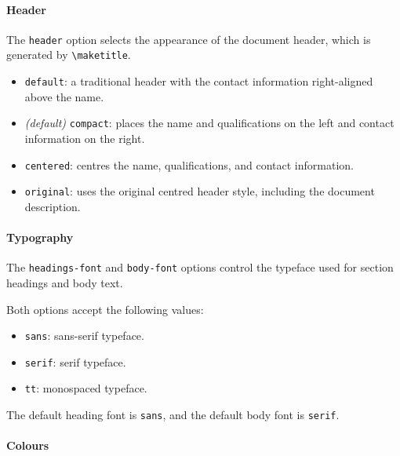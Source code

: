\documentclass[10pt]{article}
\begin{document}
\paragraph{Header}

The \verb|header| option selects the appearance of the
document header, which is generated by \verb|\maketitle|.

\begin{itemize}
    \item \verb|default|: a traditional header with the
    contact information right-aligned above the name.

    \item \textit{(default)} \verb|compact|: places the name and qualifications
    on the left and contact information on the right.

    \item \verb|centered|: centres the name, qualifications,
    and contact information.

    \item \verb|original|: uses the original centred header
    style, including the document description.
\end{itemize}

\paragraph{Typography}

The \verb|headings-font| and \verb|body-font| options control 
the typeface used for section headings and body text.

Both options accept the following values:

\begin{itemize}
    \item \verb|sans|: sans-serif typeface.
    \item \verb|serif|: serif typeface.
    \item \verb|tt|: monospaced typeface.
\end{itemize}

The default heading font is \verb|sans|, and the default
body font is \verb|serif|.

\paragraph{Colours}
\end{document}
